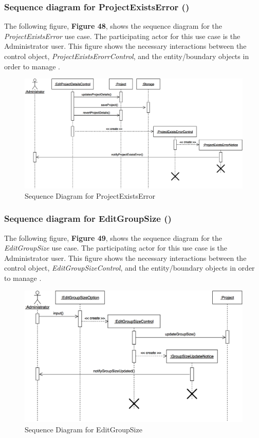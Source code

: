 \documentclass[12pt,letterpaper]{article}
\begin{document}
\subsubsection*{Sequence diagram for ProjectExistsError (\projectexistserror{})}

The following figure, {\bf Figure 48}, shows the sequence diagram for the {\it ProjectExistsError} use case. The participating actor for this use case is
the Administrator user. This figure shows the necessary interactions between the control object, {\it ProjectExistsErorrControl}, and the
entity/boundary objects in order to manage \projectexistserror{}.

\begin{figure}[H]
	\centering{}
	\includegraphics[scale=0.3]{imgs/seq/project-exists-error.png}
	\caption{Sequence Diagram for ProjectExistsError}
\end{figure}

\subsubsection*{Sequence diagram for EditGroupSize (\editgroupsize{})}

The following figure, {\bf Figure 49}, shows the sequence diagram for the {\it EditGroupSize} use case. The participating actor for this use case is
the Administrator user. This figure shows the necessary interactions between the control object, {\it EditGroupSizeControl}, and the
entity/boundary objects in order to manage \editgroupsize{}.

\begin{figure}[H]
	\centering{}
	\includegraphics[scale=0.3]{imgs/seq/edit-group-size.png}
	\caption{Sequence Diagram for EditGroupSize}
\end{figure}
\end{document}
